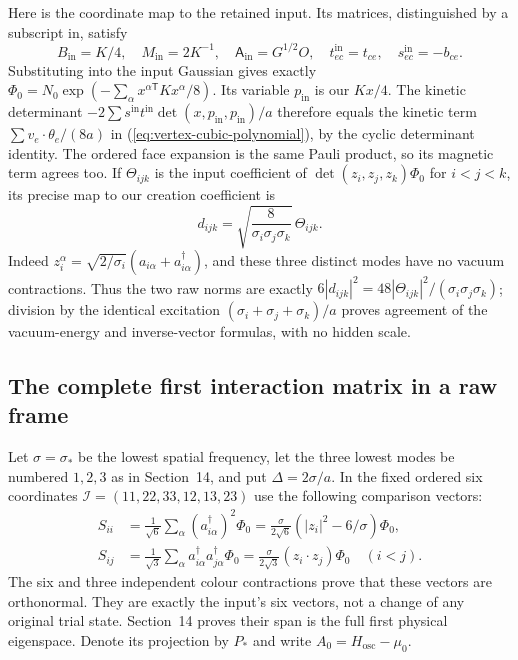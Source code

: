 Here is the coordinate map to the retained input. Its matrices,
distinguished by a subscript $\mathrm{in}$, satisfy
\begin{equation}\label{eq:band-input-dictionary}
 B_{\mathrm{in}}=K/4,\quad M_{\mathrm{in}}=2K^{-1},\quad
 \mathsf A_{\mathrm{in}}=G^{1/2}O,\quad
 t^{\mathrm{in}}_{ec}=t_{ce},\quad s^{\mathrm{in}}_{ec}=-b_{ce}.
\end{equation}
Substituting into the input Gaussian gives exactly
$\Phi_0=N_0\exp(-\sum_\alpha x^{\alpha\mathsf T}Kx^\alpha/8)$.
Its variable $p_{\mathrm{in}}$ is our $Kx/4$.
The kinetic determinant $-2\sum s^{\mathrm{in}}t^{\mathrm{in}}
\det(x,p_{\mathrm{in}},p_{\mathrm{in}})/a$ therefore equals
the kinetic term $\sum v_e\cdot\theta_e/(8a)$ in
(\ref{eq:vertex-cubic-polynomial}), by the cyclic determinant identity.
The ordered face expansion is the same Pauli product, so its magnetic
term agrees too. If $\Theta_{ijk}$ is the input coefficient of
$\det(z_i,z_j,z_k)\Phi_0$ for $i<j<k$, its precise map to
our creation coefficient is
\begin{equation}\label{eq:band-theta-map}
 d_{ijk}=\sqrt{\frac8{\sigma_i\sigma_j\sigma_k}}\,\Theta_{ijk}.
\end{equation}
Indeed $z_i^\alpha=\sqrt{2/\sigma_i}(a_{i\alpha}+a^\dagger_{i\alpha})$,
and these three distinct modes have no vacuum contractions. Thus
the two raw norms are exactly
$6|d_{ijk}|^2=48|\Theta_{ijk}|^2/(\sigma_i\sigma_j\sigma_k)$;
division by the identical excitation
$(\sigma_i+\sigma_j+\sigma_k)/a$ proves agreement of the
vacuum-energy and inverse-vector formulas, with no hidden scale.

\subsection{The complete first interaction matrix in a raw frame}

Let $\sigma=\sigma_*$ be the lowest spatial frequency, let the three
lowest modes be numbered $1,2,3$ as in Section~14, and put
$\Delta=2\sigma/a$. In the fixed ordered six coordinates
$\mathcal I=(11,22,33,12,13,23)$ use the following comparison vectors:
\begin{align}
 S_{ii}&=\frac1{\sqrt6}\sum_\alpha
                  (a^\dagger_{i\alpha})^2\Phi_0
       =\frac{\sigma}{2\sqrt6}(|z_i|^2-6/\sigma)\Phi_0,\nonumber\\
 S_{ij}&=\frac1{\sqrt3}\sum_\alpha
           a^\dagger_{i\alpha}a^\dagger_{j\alpha}\Phi_0
       =\frac{\sigma}{2\sqrt3}(z_i\cdot z_j)\Phi_0\quad(i<j).
 \label{eq:band-six-vectors}
\end{align}
The six and three independent colour contractions prove that these
vectors are orthonormal. They are exactly the input's six vectors,
not a change of any original trial state. Section~14 proves their
span is the full first physical eigenspace. Denote its projection
by $P_*$ and write $A_0=H_{\mathrm{osc}}-\mu_0$.


